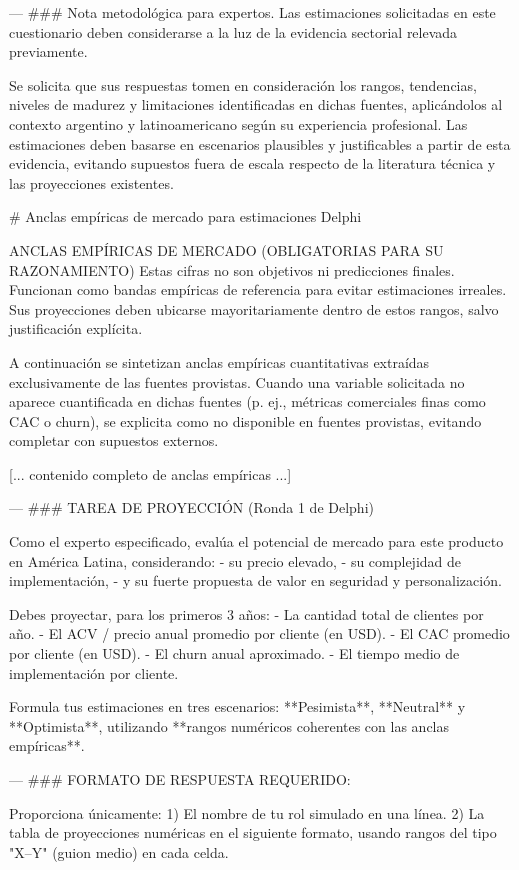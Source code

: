 \begin{APACode}
---
### Nota metodológica para expertos. Las estimaciones solicitadas en 
este cuestionario deben considerarse a la luz de la evidencia sectorial 
relevada previamente.

Se solicita que sus respuestas tomen en consideración los rangos, 
tendencias, niveles de madurez y limitaciones identificadas en dichas 
fuentes, aplicándolos al contexto argentino y latinoamericano según su 
experiencia profesional. Las estimaciones deben basarse en escenarios 
plausibles y justificables a partir de esta evidencia, evitando supuestos 
fuera de escala respecto de la literatura técnica y las proyecciones 
existentes.

# Anclas empíricas de mercado para estimaciones Delphi

ANCLAS EMPÍRICAS DE MERCADO (OBLIGATORIAS PARA SU RAZONAMIENTO)
Estas cifras no son objetivos ni predicciones finales. Funcionan como 
bandas empíricas de referencia para evitar estimaciones irreales. Sus 
proyecciones deben ubicarse mayoritariamente dentro de estos rangos, 
salvo justificación explícita.

A continuación se sintetizan anclas empíricas cuantitativas extraídas 
exclusivamente de las fuentes provistas. Cuando una variable solicitada 
no aparece cuantificada en dichas fuentes (p. ej., métricas comerciales 
finas como CAC o churn), se explicita como no disponible en fuentes 
provistas, evitando completar con supuestos externos.

[... contenido completo de anclas empíricas ...]

---
### TAREA DE PROYECCIÓN (Ronda 1 de Delphi)

Como el experto especificado, evalúa el potencial de mercado para este 
producto en América Latina, considerando:
- su precio elevado,
- su complejidad de implementación,
- y su fuerte propuesta de valor en seguridad y personalización.

Debes proyectar, para los primeros 3 años:
- La cantidad total de clientes por año.
- El ACV / precio anual promedio por cliente (en USD).
- El CAC promedio por cliente (en USD).
- El churn anual aproximado.
- El tiempo medio de implementación por cliente.

Formula tus estimaciones en tres escenarios: **Pesimista**, **Neutral** 
y **Optimista**, utilizando **rangos numéricos coherentes con las anclas 
empíricas**.

---
### FORMATO DE RESPUESTA REQUERIDO:

Proporciona únicamente:
1) El nombre de tu rol simulado en una línea.
2) La tabla de proyecciones numéricas en el siguiente formato, usando 
   rangos del tipo "X–Y" (guion medio) en cada celda.


\end{APACode}
